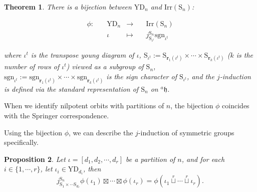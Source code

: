 \documentclass[12pt, a4paper]{amsart}
\numberwithin{equation}{section}
\newtheorem{thm}{Theorem}[section]
\newtheorem{prop}[thm]{Proposition}
\newcommand{\br}{{\mathbf{r}}}
\newcommand{\fh}{\mathfrak{h}}
\newcommand{\Irr}{{\mathrm{Irr}}}
\newcommand{\sgn}{{\mathrm{sgn}}}
\newcommand{\defmap}[5]{
           \begin{equation*}
              \begin{aligned}
                   #1:\quad  & #2 &\longrightarrow &\quad #3 \\
                      \quad  & #4    &\longmapsto  &\quad #5
              \end{aligned}
           \end{equation*}
          }
\begin{document}
\begin{thm}
    There is a bijection between $\mathrm{YD}_n$ and $\Irr(\mathrm{S}_n)$:
    \defmap{\phi}{\mathrm{YD}_n}{\Irr(\mathrm{S}_n)}{\iota}{j_{\mathrm{S}_{\iota^t}}^{\mathrm{S}_n}\sgn_{\iota^t}}
    where $\iota^t$ is the transpose young diagram of $\iota$, $\mathrm{S}_{\iota^t} := \mathrm{S}_{\br_1(\iota^t)} \times \cdots \times \mathrm{S}_{\br_k(\iota^t)}$ ($k$ is the number of rows of $\iota^t$) viewed as a subgroup of $\mathrm{S}_n$, $\sgn_{\iota^t} := \sgn_{\br_1(\iota^t)} \times \cdots \times \sgn_{\br_{k}(\iota^t)}$ is the sign character of $\mathrm{S}_{\iota^t}$, and the $j$-induction is defined via the standard representation of $\mathrm{S}_n$ on $^{a}\fh$.
\end{thm}

When we identify nilpotent orbits with partitions of $n$, the bijection $\phi$ coincides with the Springer correspondence.

Using the bijection $\phi$, we can describe the $j$-induction of symmetric groups specifically.

\begin{prop}\label{2.9}
    Let $\iota = [d_1,d_2,\cdots,d_r]$ be a partition of $n$, and for each $i \in \{1,\cdots,r\}$, let $\iota_i \in \mathrm{YD}_{d_i}$, then
    \begin{equation}
        j_{\mathrm{S}_1 \times \cdots \mathrm{S}_{d_r}}^{\mathrm{S}_n}\phi(\iota_1) \boxtimes \cdots \boxtimes \phi(\iota_r) = \phi(\iota_1 \mathop{\sqcup}\limits^r \cdots \mathop{\sqcup}\limits^r \iota_r).
    \end{equation}
\end{prop}
\end{document}
